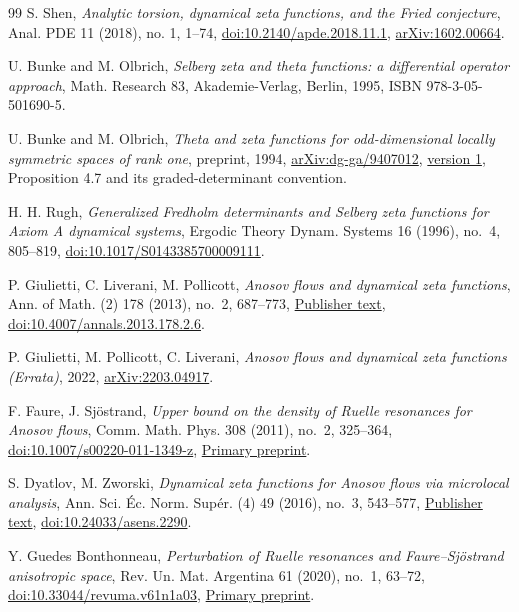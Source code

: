 \documentclass[11pt,letterpaper,reqno]{amsart}
\theoremstyle{remark}
\begin{document}
\begin{thebibliography}{99}
 S. Shen,
\emph{Analytic torsion, dynamical zeta functions, and the Fried conjecture},
Anal. PDE 11 (2018), no. 1, 1--74,
\href{https://doi.org/10.2140/apde.2018.11.1}{doi:10.2140/apde.2018.11.1},
\href{https://arxiv.org/abs/1602.00664}{arXiv:1602.00664}.

 U. Bunke and M. Olbrich,
\emph{Selberg zeta and theta functions: a differential operator approach},
Math. Research 83, Akademie-Verlag, Berlin, 1995,
ISBN 978-3-05-501690-5.

 U. Bunke and M. Olbrich,
\emph{Theta and zeta functions for odd-dimensional locally symmetric
spaces of rank one}, preprint, 1994,
\href{https://arxiv.org/abs/dg-ga/9407012}{arXiv:dg-ga/9407012},
\href{https://arxiv.org/html/dg-ga/9407012v1}{version 1},
Proposition 4.7 and its graded-determinant convention.

 H. H. Rugh,
\emph{Generalized Fredholm determinants and Selberg zeta functions for
Axiom A dynamical systems},
Ergodic Theory Dynam. Systems 16 (1996), no.~4, 805--819,
\href{https://doi.org/10.1017/S0143385700009111}{doi:10.1017/S0143385700009111}.

 P. Giulietti, C. Liverani, M. Pollicott,
\emph{Anosov flows and dynamical zeta functions},
Ann. of Math. (2) 178 (2013), no.~2, 687--773,
\href{https://annals.math.princeton.edu/2013/178-2/p06}{Publisher text},
\href{https://doi.org/10.4007/annals.2013.178.2.6}{doi:10.4007/annals.2013.178.2.6}.

 P. Giulietti, M. Pollicott, C. Liverani,
\emph{Anosov flows and dynamical zeta functions (Errata)},
2022, \href{https://arxiv.org/abs/2203.04917}{arXiv:2203.04917}.

 F. Faure, J. Sj\"ostrand,
\emph{Upper bound on the density of Ruelle resonances for Anosov flows},
Comm. Math. Phys. 308 (2011), no.~2, 325--364,
\href{https://doi.org/10.1007/s00220-011-1349-z}{doi:10.1007/s00220-011-1349-z},
\href{https://arxiv.org/abs/1003.0513}{Primary preprint}.

 S. Dyatlov, M. Zworski,
\emph{Dynamical zeta functions for Anosov flows via microlocal analysis},
Ann. Sci. \'Ec. Norm. Sup\'er. (4) 49 (2016), no.~3, 543--577,
\href{https://numdam.org/articles/10.24033/asens.2290/}{Publisher text},
\href{https://doi.org/10.24033/asens.2290}{doi:10.24033/asens.2290}.

 Y. Guedes Bonthonneau,
\emph{Perturbation of Ruelle resonances and Faure--Sj\"ostrand anisotropic space},
Rev. Un. Mat. Argentina 61 (2020), no.~1, 63--72,
\href{https://doi.org/10.33044/revuma.v61n1a03}{doi:10.33044/revuma.v61n1a03},
\href{https://arxiv.org/abs/1806.08125}{Primary preprint}.


\end{thebibliography}
\end{document}
